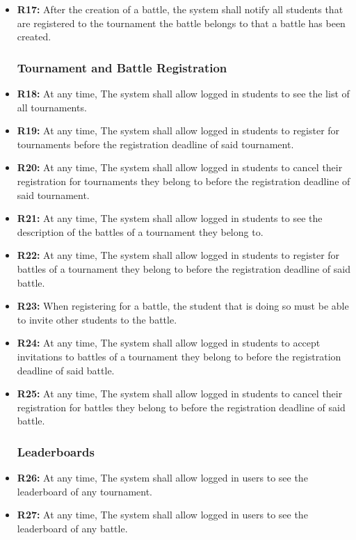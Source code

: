\documentclass{article}
\begin{document}
\begin{itemize}
    \item \textbf{R17:} After the creation of a battle, the system shall notify all students that are registered to the tournament the battle belongs to that a battle has been created.

    \subsubsection*{Tournament and Battle Registration}

    \item \textbf{R18:} At any time, The system shall allow logged in students to see the list of all tournaments.
    \item \textbf{R19:} At any time, The system shall allow logged in students to register for tournaments before the registration deadline of said tournament.
    \item \textbf{R20:} At any time, The system shall allow logged in students to cancel their registration for tournaments they belong to before the registration deadline of said tournament.
    \item \textbf{R21:} At any time, The system shall allow logged in students to see the description of the battles of a tournament they belong to.
    \item \textbf{R22:} At any time, The system shall allow logged in students to register for battles of a tournament they belong to before the registration deadline of said battle.
    \item \textbf{R23:} When registering for a battle, the student that is doing so must be able to invite other students to the battle.
    \item \textbf{R24:} At any time, The system shall allow logged in students to accept invitations to battles of a tournament they belong to before the registration deadline of said battle.
    \item \textbf{R25:} At any time, The system shall allow logged in students to cancel their registration for battles they belong to before the registration deadline of said battle.
    
    \subsubsection*{Leaderboards}

    \item \textbf{R26:} At any time, The system shall allow logged in users to see the leaderboard of any tournament.
    \item \textbf{R27:} At any time, The system shall allow logged in users to see the leaderboard of any battle.
    

\end{itemize}
\end{document}
